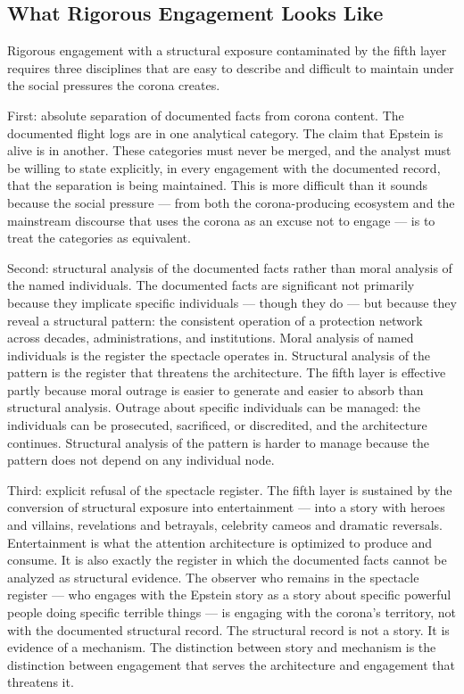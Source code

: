 \documentclass[11pt,a4paper]{article}
\begin{document}
\subsection{What Rigorous Engagement Looks Like}

Rigorous engagement with a structural exposure contaminated by the fifth layer requires three disciplines that are easy to describe and difficult to maintain under the social pressures the corona creates.


First: absolute separation of documented facts from corona content. The documented flight logs are in one analytical category. The claim that Epstein is alive is in another. These categories must never be merged, and the analyst must be willing to state explicitly, in every engagement with the documented record, that the separation is being maintained. This is more difficult than it sounds because the social pressure — from both the corona-producing ecosystem and the mainstream discourse that uses the corona as an excuse not to engage — is to treat the categories as equivalent.


Second: structural analysis of the documented facts rather than moral analysis of the named individuals. The documented facts are significant not primarily because they implicate specific individuals — though they do — but because they reveal a structural pattern: the consistent operation of a protection network across decades, administrations, and institutions. Moral analysis of named individuals is the register the spectacle operates in. Structural analysis of the pattern is the register that threatens the architecture. The fifth layer is effective partly because moral outrage is easier to generate and easier to absorb than structural analysis. Outrage about specific individuals can be managed: the individuals can be prosecuted, sacrificed, or discredited, and the architecture continues. Structural analysis of the pattern is harder to manage because the pattern does not depend on any individual node.


Third: explicit refusal of the spectacle register. The fifth layer is sustained by the conversion of structural exposure into entertainment — into a story with heroes and villains, revelations and betrayals, celebrity cameos and dramatic reversals. Entertainment is what the attention architecture is optimized to produce and consume. It is also exactly the register in which the documented facts cannot be analyzed as structural evidence. The observer who remains in the spectacle register — who engages with the Epstein story as a story about specific powerful people doing specific terrible things — is engaging with the corona's territory, not with the documented structural record. The structural record is not a story. It is evidence of a mechanism. The distinction between story and mechanism is the distinction between engagement that serves the architecture and engagement that threatens it.
\end{document}
